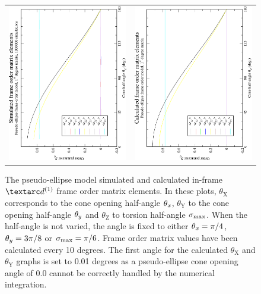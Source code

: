 \begin{figure}
\begin{tabular}{@{}cc@{}}
    \\[-5pt]
    \includegraphics[width=.35\textwidth,angle=270]{images/frame_order_matrix/Sij_pseudo-ellipse_in_frame_theta_z_ens1000000.eps} &
    \includegraphics[width=.35\textwidth,angle=270]{images/frame_order_matrix/Sij_pseudo-ellipse_in_frame_theta_z_calc.eps} \\
  \end{tabular}
  \caption[Pseudo-ellipse simulated and calculated in-frame $\FOone$ elements.]{
    The pseudo-ellipse model simulated and calculated in-frame $\FOone$ frame order matrix elements.
    In these plots, $\theta_\textrm{X}$ corresponds to the cone opening half-angle $\theta_x$, $\theta_\textrm{Y}$ to the cone opening half-angle $\theta_y$ and $\theta_\textrm{Z}$ to torsion half-angle $\sigma_\textrm{max}$.
    When the half-angle is not varied, the angle is fixed to either $\theta_x = \pi/4$, $\theta_y = 3\pi/8$ or $\sigma_\textrm{max} = \pi/6$.
    Frame order matrix values have been calculated every 10 degrees.
    The first angle for the calculated $\theta_\textrm{X}$ and $\theta_\textrm{Y}$ graphs is set to 0.01 degrees as a pseudo-ellipse cone opening angle of 0.0 cannot be correctly handled by the numerical integration.
  }
  \label{fig: simulated and calculated in-frame 1st degree pseudo-ellipse frame order}
\end{figure}

